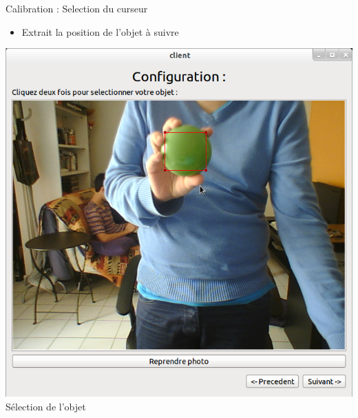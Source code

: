 \documentclass{beamer}
\begin{document}
		\begin{frame}{Calibration : Selection du curseur}
			\begin{itemize}
				\item{Extrait la position de l'objet à suivre}
			\end{itemize}
			\begin{center}
				\includegraphics[scale=0.25]{Capture1.png}\\
				Sélection de l'objet
			\end{center}
		
		\end{frame}
\end{document}
